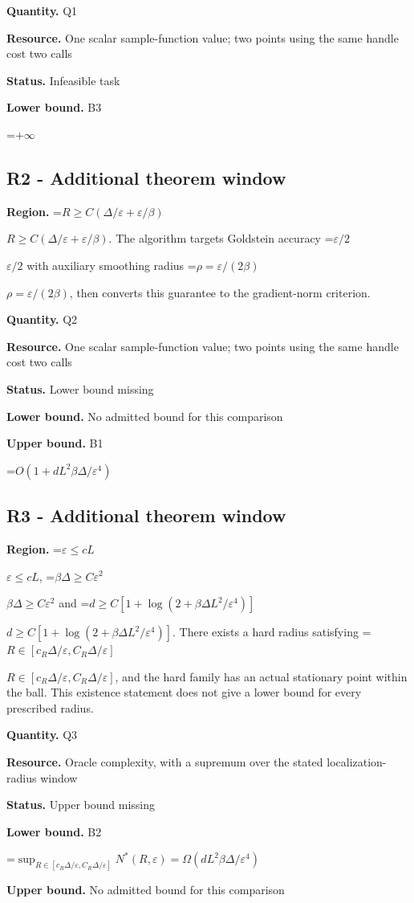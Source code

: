 \documentclass[10pt,a4paper]{article}
\newcommand{\AtlasMath}[1]{\par\begingroup\centering\setbox0=\hbox{$\displaystyle #1$}\ifdim\wd0>1.4\linewidth\typeout{ATLAS WIDE FORMULA: \the\wd0}\fi\ifdim\wd0>\linewidth\resizebox{\linewidth}{!}{\box0}\else\box0\fi\par\endgroup}
\newcommand{\AtlasInlineMath}[1]{\begingroup\setbox0=\hbox{$#1$}\ifdim\wd0>.4\linewidth\endgroup\AtlasMath{#1}\else\endgroup$#1$\fi}
\begin{document}
\textbf{Quantity.} Q1

\textbf{Resource.} One scalar sample-function value; two points using the same handle cost two calls

\textbf{Status.} Infeasible task

\textbf{Lower bound.} B3

\AtlasMath{+\infty}
\subsection{R2 - Additional theorem window}
\textbf{Region.} \AtlasInlineMath{R\ge C(\Delta/\varepsilon+\varepsilon/\beta)}. The algorithm targets Goldstein accuracy \AtlasInlineMath{\varepsilon/2} with auxiliary smoothing radius \AtlasInlineMath{\rho=\varepsilon/(2\beta)}, then converts this guarantee to the gradient-norm criterion.

\textbf{Quantity.} Q2

\textbf{Resource.} One scalar sample-function value; two points using the same handle cost two calls

\textbf{Status.} Lower bound missing

\textbf{Lower bound.} No admitted bound for this comparison

\textbf{Upper bound.} B1

\AtlasMath{O(1+dL^2\beta\Delta/\varepsilon^4)}
\subsection{R3 - Additional theorem window}
\textbf{Region.} \AtlasInlineMath{\varepsilon\le cL}, \AtlasInlineMath{\beta\Delta\ge C\varepsilon^2} and \AtlasInlineMath{d\ge C[1+\log(2+\beta\Delta L^2/\varepsilon^4)]}. There exists a hard radius satisfying \AtlasInlineMath{R\in[c_R\Delta/\varepsilon,C_R\Delta/\varepsilon]}, and the hard family has an actual stationary point within the ball. This existence statement does not give a lower bound for every prescribed radius.

\textbf{Quantity.} Q3

\textbf{Resource.} Oracle complexity, with a supremum over the stated localization-radius window

\textbf{Status.} Upper bound missing

\textbf{Lower bound.} B2

\AtlasMath{\sup_{R\in[c_R\Delta/\varepsilon,C_R\Delta/\varepsilon]}N^*(R,\varepsilon)=\Omega(dL^2\beta\Delta/\varepsilon^4)}
\textbf{Upper bound.} No admitted bound for this comparison
\end{document}
